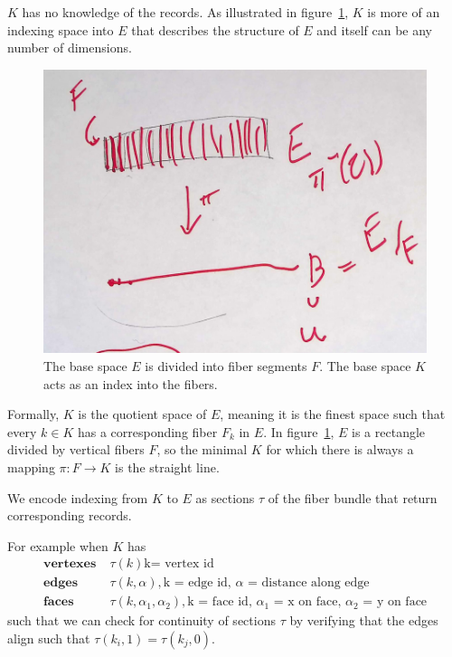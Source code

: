 \documentclass[../main.tex]{subfiles}
\begin{document}
$K$ has no knowledge of the records. As illustrated in figure~\ref{fig:base_space_div}, $K$ is more of an indexing space into $E$ that describes the structure of $E$ and itself can be any number of dimensions. 

\begin{figure}[ht!]
    \label{fig:base_space_div}
    \includegraphics[width=.5\linewidth]{figures/math/k_qspace.png}
    \caption{ The base space $E$ is divided into fiber segments $F$. The base space $K$ acts as an index into the fibers.}
\end{figure}

Formally, $K$ is the quotient space \cite{QuotientSpaceTopology2020} of $E$, meaning it is the finest space such that every $k \in K$ has a corresponding fiber $F_k$ in $E$. In figure~\ref{fig:base_space_div}, $E$ is a rectangle divided by vertical fibers $F$, so the minimal $K$ for which there is always a mapping $\pi: F\rightarrow K$ is the straight line. 

We encode indexing from $K$ to $E$ as sections $\tau$ of the fiber bundle that return corresponding records. 


For example when $K$ has
\begin{align*}
    \textbf{vertexes}\;& \tau(k) \text{k= vertex id}\\
    \textbf{edges}\;& \tau(k,\alpha), \text{k = edge id, $\alpha$ = distance along edge} \\
    \textbf{faces}\;& \tau(k,\alpha_1, \alpha_2), \text{k = face id, $\alpha_1$ = x on face, $\alpha_2$ = y on face}
\end{align*}
such that we can check for continuity of sections $\tau$ by verifying that the edges align such that $\tau(k_{i},1) = \tau(k_{j},0)$. 

\begin{figure}
\end{figure}
\end{document}
